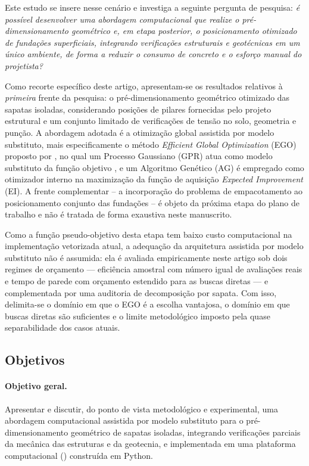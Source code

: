Este estudo se insere nesse cenário e investiga a seguinte pergunta de pesquisa: \textit{é possível desenvolver uma abordagem computacional que realize o pré-dimensionamento geométrico e, em etapa posterior, o posicionamento otimizado de fundações superficiais, integrando verificações estruturais e geotécnicas em um único ambiente, de forma a reduzir o consumo de concreto e o esforço manual do projetista?}

Como recorte específico deste artigo, apresentam-se os resultados relativos à \textit{primeira} frente da pesquisa: o pré-dimensionamento geométrico otimizado das sapatas isoladas, considerando posições de pilares fornecidas pelo projeto estrutural e um conjunto limitado de verificações de tensão no solo, geometria e punção. A abordagem adotada é a otimização global assistida por modelo substituto, mais especificamente o método \textit{Efficient Global Optimization} (EGO) proposto por , no qual um Processo Gaussiano (GPR) atua como modelo substituto da função objetivo , e um Algoritmo Genético (AG) é empregado como otimizador interno na maximização da função de aquisição \textit{Expected Improvement} (EI). A frente complementar -- a incorporação do problema de empacotamento ao posicionamento conjunto das fundações -- é objeto da próxima etapa do plano de trabalho e não é tratada de forma exaustiva neste manuscrito.

Como a função pseudo-objetivo desta etapa tem baixo custo computacional na implementação vetorizada atual, a adequação da arquitetura assistida por modelo substituto não é assumida: ela é avaliada empiricamente neste artigo sob dois regimes de orçamento — eficiência amostral com número igual de avaliações reais e tempo de parede com orçamento estendido para as buscas diretas — e complementada por uma auditoria de decomposição por sapata. Com isso, delimita-se o domínio em que o EGO é a escolha vantajosa, o domínio em que buscas diretas são suficientes e o limite metodológico imposto pela quase separabilidade dos casos atuais.

\subsection{Objetivos}
\label{sec:objetivos}

\paragraph{Objetivo geral.} Apresentar e discutir, do ponto de vista metodológico e experimental, uma abordagem computacional assistida por modelo substituto para o pré-dimensionamento geométrico de sapatas isoladas, integrando verificações parciais da mecânica das estruturas e da geotecnia, e implementada em uma plataforma computacional (\fundaai{}) construída em Python.

